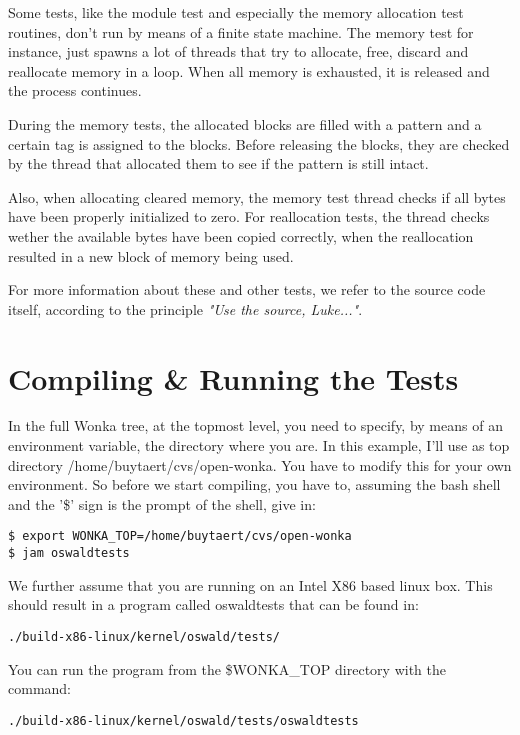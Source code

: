 Some tests, like the module test and especially the memory allocation test
routines, don't run by means of a finite state machine. The memory test for
instance, just spawns a lot of threads that try to allocate, free, discard
and reallocate memory in a loop. When all memory is exhausted, it is
released and the process continues.

During the memory tests, the allocated blocks are filled with a pattern and
a certain tag is assigned to the blocks. Before releasing the blocks, they
are checked by the thread that allocated them to see if the pattern is still
intact.

Also, when allocating cleared memory, the memory test thread checks if all
bytes have been properly initialized to zero. For reallocation tests, the
thread checks wether the available bytes have been copied correctly, when
the reallocation resulted in a new block of memory being used.

For more information about these and other tests, we refer to the source
code itself, according to the principle \textit{"Use the source, Luke..."}.

\section{Compiling \& Running the Tests}

In the full Wonka tree, at the topmost level, you need to specify, by means
of an environment variable, the directory where you are. In this example,
I'll use as top directory \textsf{/home/buytaert/cvs/open-wonka}. You have
to modify this for your own environment. So before we start compiling, you
have to, assuming the bash shell and the '\$' sign is the prompt of the
shell, give in:

\begin{verbatim}
$ export WONKA_TOP=/home/buytaert/cvs/open-wonka
$ jam oswaldtests
\end{verbatim}

We further assume that you are running on an Intel X86 based linux box.
This should result in a program called \textsf{oswaldtests} that can be
found in:

\begin{verbatim}
./build-x86-linux/kernel/oswald/tests/
\end{verbatim}

You can run the program from the \textsf{\$WONKA\_TOP} directory with the
command:

\begin{verbatim}
./build-x86-linux/kernel/oswald/tests/oswaldtests
\end{verbatim}

